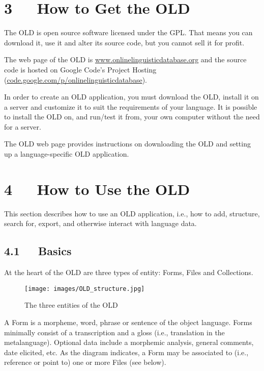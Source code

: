 \documentclass[letterpaper,10pt,english]{sphinxmanual}
\begin{document}
\chapter{3   How to Get the OLD}
\label{documentation:how-to-get-the-old}
The OLD is open source software licensed under the GPL.  That means you can
download it, use it and alter its source code, but you cannot sell it for profit.

The web page of the OLD is \href{http://www.onlinelinguisticdatabase.org}{www.onlinelinguisticdatabase.org} and the source code
is hosted on Google Code's Project Hosting
(\href{http://code.google.com/p/onlinelinguisticdatabase}{code.google.com/p/onlinelinguisticdatabase}).

In order to create an OLD application, you must download the OLD, install it
on a server and customize it to suit the requirements of your language.  It is
possible to install the OLD on, and run/test it from, your own computer without
the need for a server.

The OLD web page provides instructions on downloading the OLD and setting up a
language-specific OLD application.


\chapter{4   How to Use the OLD}
\label{documentation:how-to-use-the-old}
This section describes how to use an OLD application, i.e., how to add,
structure, search for, export, and otherwise interact with language data.


\section{4.1   Basics}
\label{documentation:basics}
At the heart of the OLD are three types of entity: Forms, Files and Collections.
\begin{figure}[htbp]
\centering
\capstart

\texttt{[image: images/OLD\_structure.jpg]}
\caption{The three entities of the OLD}\end{figure}

A Form is a morpheme, word, phrase or sentence of the object language.  Forms
minimally consist of a transcription and a gloss (i.e., translation in the
metalanguage).  Optional data include a morphemic analysis, general comments,
date elicited, etc.  As the diagram indicates, a Form may be associated to
(i.e., reference or point to) one or more Files (see below).
\end{document}
